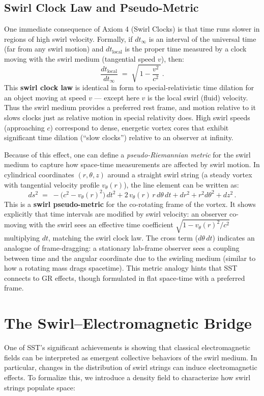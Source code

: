 \documentclass[reprint,aps,onecolumn,nofootinbib]{revtex4-2}
\begin{document}
	\subsection*{Swirl Clock Law and Pseudo-Metric}
	One immediate consequence of Axiom 4 (Swirl Clocks) is that time runs slower in regions of high swirl velocity. Formally, if $dt_{\infty}$ is an interval of the universal time (far from any swirl motion) and $dt_{\text{local}}$ is the proper time measured by a clock moving with the swirl medium (tangential speed $v$), then:
	\[
		\frac{dt_{\text{local}}}{dt_{\infty}} \;=\; \sqrt{\,1 - \frac{v^2}{c^2}\,}\,.
	\]
	This \textbf{swirl clock law} is identical in form to special-relativistic time dilation for an object moving at speed $v$ — except here $v$ is the local swirl (fluid) velocity. Thus the swirl medium provides a preferred rest frame, and motion relative to it slows clocks just as relative motion in special relativity does. High swirl speeds (approaching $c$) correspond to dense, energetic vortex cores that exhibit significant time dilation (“slow clocks”) relative to an observer at infinity.

	Because of this effect, one can define a \emph{pseudo-Riemannian metric} for the swirl medium to capture how space-time measurements are affected by swirl motion. In cylindrical coordinates $(r,\theta,z)$ around a straight swirl string (a steady vortex with tangential velocity profile $v_{\theta}(r)$), the line element can be written as:
	\[
		ds^2 \;=\; -\big(c^2 - v_{\theta}(r)^2\big)\,dt^2 + 2\,v_{\theta}(r)\,r\,d\theta\,dt + dr^2 + r^2 d\theta^2 + dz^2\,.
	\]
	This is a \textbf{swirl pseudo-metric} for the co-rotating frame of the vortex. It shows explicitly that time intervals are modified by swirl velocity: an observer co-moving with the swirl sees an effective time coefficient $\sqrt{1 - v_{\theta}(r)^2/c^2}$ multiplying $dt$, matching the swirl clock law. The cross term ($d\theta\,dt$) indicates an analogue of frame-dragging: a stationary lab-frame observer sees a coupling between time and the angular coordinate due to the swirling medium (similar to how a rotating mass drags spacetime). This metric analogy hints that SST connects to GR effects, though formulated in flat space-time with a preferred frame.


	\section{The Swirl–Electromagnetic Bridge}
	One of SST’s significant achievements is showing that classical electromagnetic fields can be interpreted as emergent collective behaviors of the swirl medium. In particular, changes in the distribution of swirl strings can induce electromagnetic effects. To formalize this, we introduce a density field to characterize how swirl strings populate space:
\end{document}
